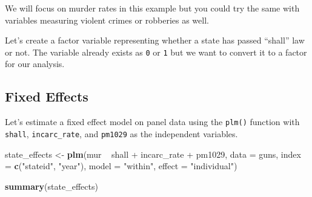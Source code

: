 \documentclass[]{article}
\newenvironment{Shaded}{\begin{snugshade}}{\end{snugshade}}
\newcommand{\KeywordTok}[1]{\textcolor[rgb]{0.13,0.29,0.53}{\textbf{{#1}}}}
\newcommand{\DataTypeTok}[1]{\textcolor[rgb]{0.13,0.29,0.53}{{#1}}}
\newcommand{\DecValTok}[1]{\textcolor[rgb]{0.00,0.00,0.81}{{#1}}}
\newcommand{\StringTok}[1]{\textcolor[rgb]{0.31,0.60,0.02}{{#1}}}
\newcommand{\NormalTok}[1]{{#1}}
\theoremstyle{definition}
\theoremstyle{definition}
\theoremstyle{remark}
\begin{document}
We will focus on murder rates in this example but you could try the same
with variables measuring violent crimes or robberies as well.

Let's create a factor variable representing whether a state has passed
``shall'' law or not. The variable already exists as \texttt{0} or
\texttt{1} but we want to convert it to a factor for our analysis.

\begin{Shaded}
\end{Shaded}

\subsection{Fixed Effects}\label{fixed-effects}

Let's estimate a fixed effect model on panel data using the
\texttt{plm()} function with \texttt{shall}, \texttt{incarc\_rate}, and
\texttt{pm1029} as the independent variables.

\begin{Shaded}
\begin{Highlighting}[]
\NormalTok{state_effects <-}\StringTok{ }\KeywordTok{plm}\NormalTok{(mur ~}\StringTok{ }\NormalTok{shall +}\StringTok{ }\NormalTok{incarc_rate +}\StringTok{ }\NormalTok{pm1029, }
                     \DataTypeTok{data =} \NormalTok{guns, }
                     \DataTypeTok{index =} \KeywordTok{c}\NormalTok{(}\StringTok{"stateid"}\NormalTok{, }\StringTok{"year"}\NormalTok{), }
                     \DataTypeTok{model =} \StringTok{"within"}\NormalTok{, }
                     \DataTypeTok{effect =} \StringTok{"individual"}\NormalTok{)}

\KeywordTok{summary}\NormalTok{(state_effects)}
\end{Highlighting}
\end{Shaded}
\end{document}
